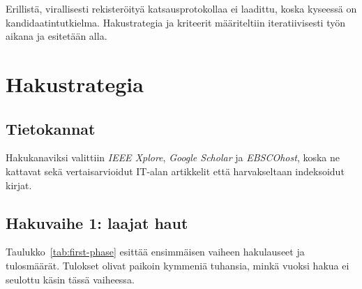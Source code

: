 \documentclass[bscthesis,finnish,oneside,biblatex]{uefcsthesis}
\begin{document}
    Erillistä, virallisesti rekisteröityä katsausprotokollaa ei laadittu,
    koska kyseessä on kandidaatintutkielma. Hakustrategia ja kriteerit määriteltiin iteratiivisesti työn aikana ja esitetään alla.


    \section{Hakustrategia}
    \label{sec:search-strategy}

    \subsection{Tietokannat}
    Hakukanaviksi valittiin \emph{IEEE Xplore}, \emph{Google Scholar}
    ja \emph{EBSCOhost}, koska ne kattavat sekä vertaisarvioidut IT-alan artikkelit että harvakseltaan indeksoidut kirjat.

    \subsection{Hakuvaihe 1: laajat haut}
    Taulukko~\ref{tab:first-phase} esittää ensimmäisen vaiheen hakulauseet ja tulosmäärät. Tulokset olivat paikoin kymmeniä tuhansia,
    minkä vuoksi hakua ei seulottu käsin tässä vaiheessa.
\end{document}
